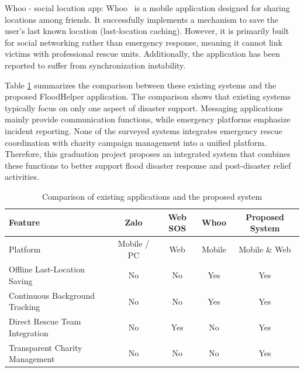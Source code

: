 \documentclass[../Main.tex]{subfiles}
\begin{document}
Whoo - social location app: Whoo~\cite{whooapp} is a mobile application designed for sharing locations among friends. It successfully implements a mechanism to save the user's last known location (last-location caching). However, it is primarily built for social networking rather than emergency response, meaning it cannot link victims with professional rescue units. Additionally, the application has been reported to suffer from synchronization instability.

Table \ref{table:2.1} summarizes the comparison between these existing systems and the proposed FloodHelper application. The comparison shows that existing systems typically focus on only one aspect of disaster support. Messaging applications mainly provide communication functions, while emergency platforms emphasize incident reporting. None of the surveyed systems integrates emergency rescue coordination with charity campaign management into a unified platform. Therefore, this graduation project proposes an integrated system that combines these functions to better support flood disaster response and post-disaster relief activities.

\begin{table}[htpb]
    \centering
    \caption{Comparison of existing applications and the proposed system}
    \label{table:2.1}
    \renewcommand{\arraystretch}{1.3} %
    \begin{tabular}{|l|c|c|c|c|}
        \hline
        \textbf{Feature}               & \textbf{Zalo} & \textbf{Web SOS} & \textbf{Whoo} & \textbf{Proposed System} \\
        \hline
        Platform                       & Mobile / PC   & Web              & Mobile        & Mobile \& Web            \\
        \hline
        Offline Last-Location Saving   & No            & No               & Yes           & Yes                      \\
        \hline
        Continuous Background Tracking & No            & No               & Yes           & Yes                      \\
        \hline
        Direct Rescue Team Integration & No            & Yes              & No            & Yes                      \\
        \hline
        Transparent Charity Management & No            & No               & No            & Yes                      \\
        \hline
    \end{tabular}
\end{table}
\end{document}
